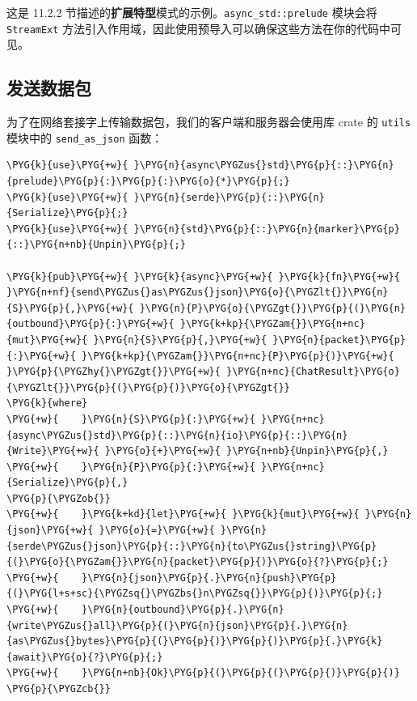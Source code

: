 这是 11.2.2 节描述的\textbf{扩展特型}模式的示例。\texttt{async\_std::prelude} 模块会将 \texttt{StreamExt} 方法引入作用域，因此使用预导入可以确保这些方法在你的代码中可见。

\subsection{发送数据包}

为了在网络套接字上传输数据包，我们的客户端和服务器会使用库 crate 的 \texttt{utils} 模块中的 \texttt{send\_as\_json} 函数：

\begin{Verbatim}[commandchars=\\\{\},breaklines=true,breakanywhere=true,fontsize=\codefont,xleftmargin=17bp]
\PYG{k}{use}\PYG{+w}{ }\PYG{n}{async\PYGZus{}std}\PYG{p}{::}\PYG{n}{prelude}\PYG{p}{:}\PYG{p}{:}\PYG{o}{*}\PYG{p}{;}
\PYG{k}{use}\PYG{+w}{ }\PYG{n}{serde}\PYG{p}{::}\PYG{n}{Serialize}\PYG{p}{;}
\PYG{k}{use}\PYG{+w}{ }\PYG{n}{std}\PYG{p}{::}\PYG{n}{marker}\PYG{p}{::}\PYG{n+nb}{Unpin}\PYG{p}{;}

\PYG{k}{pub}\PYG{+w}{ }\PYG{k}{async}\PYG{+w}{ }\PYG{k}{fn}\PYG{+w}{ }\PYG{n+nf}{send\PYGZus{}as\PYGZus{}json}\PYG{o}{\PYGZlt{}}\PYG{n}{S}\PYG{p}{,}\PYG{+w}{ }\PYG{n}{P}\PYG{o}{\PYGZgt{}}\PYG{p}{(}\PYG{n}{outbound}\PYG{p}{:}\PYG{+w}{ }\PYG{k+kp}{\PYGZam{}}\PYG{n+nc}{mut}\PYG{+w}{ }\PYG{n}{S}\PYG{p}{,}\PYG{+w}{ }\PYG{n}{packet}\PYG{p}{:}\PYG{+w}{ }\PYG{k+kp}{\PYGZam{}}\PYG{n+nc}{P}\PYG{p}{)}\PYG{+w}{ }\PYG{p}{\PYGZhy{}\PYGZgt{}}\PYG{+w}{ }\PYG{n+nc}{ChatResult}\PYG{o}{\PYGZlt{}}\PYG{p}{(}\PYG{p}{)}\PYG{o}{\PYGZgt{}}
\PYG{k}{where}
\PYG{+w}{    }\PYG{n}{S}\PYG{p}{:}\PYG{+w}{ }\PYG{n+nc}{async\PYGZus{}std}\PYG{p}{::}\PYG{n}{io}\PYG{p}{::}\PYG{n}{Write}\PYG{+w}{ }\PYG{o}{+}\PYG{+w}{ }\PYG{n+nb}{Unpin}\PYG{p}{,}
\PYG{+w}{    }\PYG{n}{P}\PYG{p}{:}\PYG{+w}{ }\PYG{n+nc}{Serialize}\PYG{p}{,}
\PYG{p}{\PYGZob{}}
\PYG{+w}{    }\PYG{k+kd}{let}\PYG{+w}{ }\PYG{k}{mut}\PYG{+w}{ }\PYG{n}{json}\PYG{+w}{ }\PYG{o}{=}\PYG{+w}{ }\PYG{n}{serde\PYGZus{}json}\PYG{p}{::}\PYG{n}{to\PYGZus{}string}\PYG{p}{(}\PYG{o}{\PYGZam{}}\PYG{n}{packet}\PYG{p}{)}\PYG{o}{?}\PYG{p}{;}
\PYG{+w}{    }\PYG{n}{json}\PYG{p}{.}\PYG{n}{push}\PYG{p}{(}\PYG{l+s+sc}{\PYGZsq{}\PYGZbs{}n\PYGZsq{}}\PYG{p}{)}\PYG{p}{;}
\PYG{+w}{    }\PYG{n}{outbound}\PYG{p}{.}\PYG{n}{write\PYGZus{}all}\PYG{p}{(}\PYG{n}{json}\PYG{p}{.}\PYG{n}{as\PYGZus{}bytes}\PYG{p}{(}\PYG{p}{)}\PYG{p}{)}\PYG{p}{.}\PYG{k}{await}\PYG{o}{?}\PYG{p}{;}
\PYG{+w}{    }\PYG{n+nb}{Ok}\PYG{p}{(}\PYG{p}{(}\PYG{p}{)}\PYG{p}{)}
\PYG{p}{\PYGZcb{}}
\end{Verbatim}

